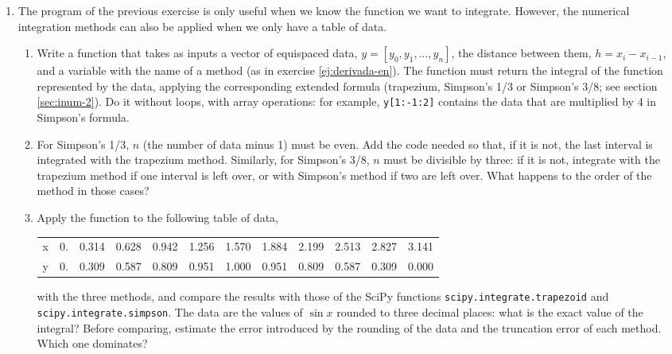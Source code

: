 \begin{enumerate}
\item \label{ej:integra_tabla-en} The program of the previous exercise is only useful when we know the function we want to integrate. However, the numerical integration methods can also be applied when we only have a table of data.
\begin{enumerate}
\item Write a function that takes as inputs a vector of equispaced data, $y=[y_0,y_1,\dots,y_n]$, the distance between them, $h=x_i - x_{i-1}$, and a variable with the name of a method (as in exercise \ref{ej:derivada-en}). The function must return the integral of the function represented by the data, applying the corresponding extended formula (trapezium, Simpson's 1/3 or Simpson's 3/8; see section \ref{sec:inum-2}). Do it without loops, with array operations: for example, \texttt{y[1:-1:2]} contains the data that are multiplied by 4 in Simpson's formula.
\item For Simpson's 1/3, $n$ (the number of data minus 1) must be even. Add the code needed so that, if it is not, the last interval is integrated with the trapezium method. Similarly, for Simpson's 3/8, $n$ must be divisible by three: if it is not, integrate with the trapezium method if one interval is left over, or with Simpson's method if two are left over. What happens to the order of the method in those cases?
\item Apply the function to the following table of data,

\smallskip
{\small\begin{tabular}{r r r r r r r r r r r r}
\hline
x & 0. &0.314 & 	0.628 &	0.942 &	1.256 &	1.570 &	1.884 &	 2.199 &	2.513 &	 2.827 &	3.141\\
y & 0. &0.309 &	0.587 &	0.809 &	0.951 &	1.000 &	0.951 &    0.809 &	0.587 &	0.309 &	0.000\\
\hline
\end{tabular}}
\smallskip

\noindent with the three methods, and compare the results with those of the SciPy functions \texttt{scipy.integrate.trapezoid} and \texttt{scipy.integrate.simpson}. The data are the values of $\sin x$ rounded to three decimal places: what is the exact value of the integral? Before comparing, estimate the error introduced by the rounding of the data and the truncation error of each method. Which one dominates?
\end{enumerate}


\end{enumerate}
